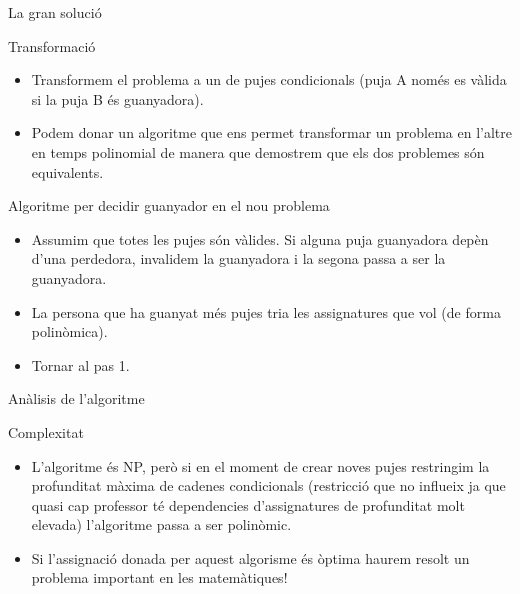 \documentclass[twocolumn]{beamer}
\begin{document}
\begin{frame}{La gran solució}
\begin{block}{Transformació}
	\begin{itemize}
		\item Transformem el problema a un de pujes condicionals (puja A només es vàlida si la puja B és guanyadora).
		\item Podem donar un algoritme que ens permet transformar un problema en l'altre en temps polinomial de manera que demostrem que els dos problemes són equivalents.
	\end{itemize}
\end{block}
\begin{block}{Algoritme per decidir guanyador en el nou problema}
	\begin{itemize}
		\small
		\item Assumim que totes les pujes són vàlides. Si alguna puja guanyadora depèn d'una perdedora, invalidem la guanyadora i la segona passa a ser la guanyadora.
		\item La persona que ha guanyat més pujes tria les assignatures que vol (de forma polinòmica).
		\item Tornar al pas 1.
	\end{itemize}
\end{block}
\end{frame}

\begin{frame}{Anàlisis de l'algoritme}
\begin{block}{Complexitat}
	\begin{itemize}
		\item L'algoritme és NP, però si en el moment de crear noves pujes restringim la profunditat màxima de cadenes condicionals (restricció que no influeix ja que quasi cap professor té dependencies d'assignatures de profunditat molt elevada) l'algoritme passa a ser polinòmic.
		\item Si l'assignació donada per aquest algorisme és òptima haurem resolt un problema important en les matemàtiques!
	\end{itemize}
\end{block}
\end{frame}
\end{document}
